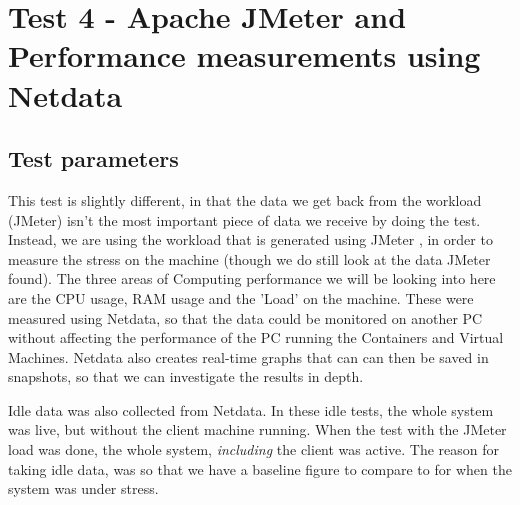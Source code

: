 \section{Test 4 - Apache JMeter and Performance measurements using Netdata}
\subsection{Test parameters}
\label{Test4TestParameters}
This test is slightly different, in that the data we get back from the workload (JMeter) isn't the most important piece of data we receive by doing the test. Instead, we are using the workload that is generated using JMeter \citep{ApacheJMeter}, in order to measure the stress on the machine (though we do still look at the data JMeter found). The three areas of Computing performance we will be looking into here are the CPU usage, RAM usage and the 'Load' on the machine. These were measured using Netdata\citep{Netdata}, so that the data could be monitored on another PC without affecting the performance of the PC running the Containers and Virtual Machines. Netdata also creates real-time graphs that can can then be saved in snapshots, so that we can investigate the results in depth.

Idle data was also collected from Netdata. In these idle tests, the whole system was live, but without the client machine running. When the test with the JMeter load was done, the whole system, \emph{including} the client was active. The reason for taking idle data, was so that we have a baseline figure to compare to for when the system was under stress.

